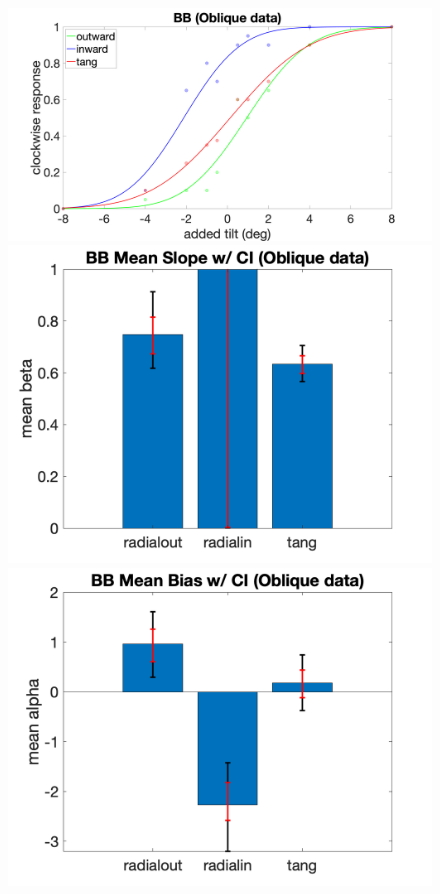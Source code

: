 \documentclass[11pt]{article} %
\begin{document}
\begin{figure}[H]
\includegraphics[scale=.06]{Images/PF_BB_oblique.png}
\includegraphics[scale=.11]{Images/MeanSlopeError_ci_BB_oblique.png}
\includegraphics[scale=.11]{Images/MeanBiasError_ci_BB_oblique.png}

\end{figure}
\end{document}
